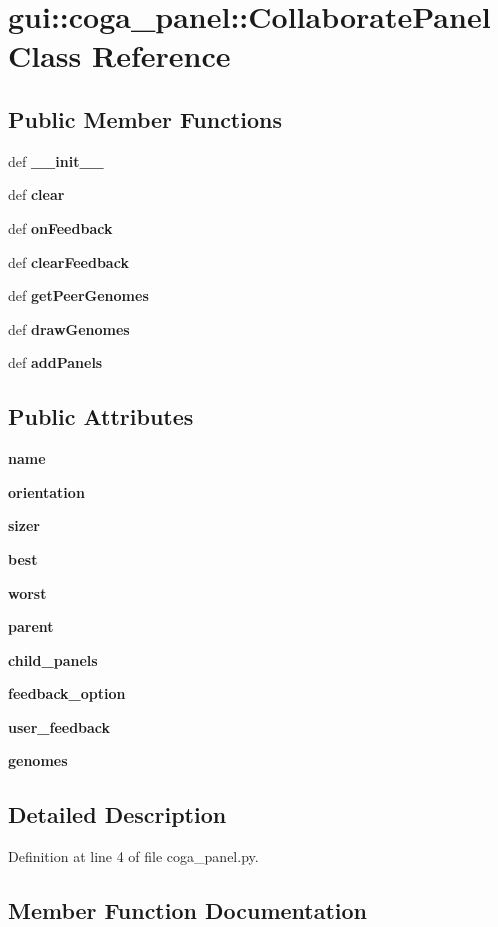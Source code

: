 \section{gui::coga\_\-panel::CollaboratePanel Class Reference}
\label{classgui_1_1coga__panel_1_1CollaboratePanel}
\subsection*{Public Member Functions}
\begin{CompactItemize}
\item 
def {\bf \_\-\_\-init\_\-\_\-}
\item 
def {\bf clear}
\item 
def {\bf onFeedback}
\item 
def {\bf clearFeedback}
\item 
def {\bf getPeerGenomes}
\item 
def {\bf drawGenomes}
\item 
def {\bf addPanels}
\end{CompactItemize}
\subsection*{Public Attributes}
\begin{CompactItemize}
\item 
{\bf name}
\item 
{\bf orientation}
\item 
{\bf sizer}
\item 
{\bf best}
\item 
{\bf worst}
\item 
{\bf parent}
\item 
{\bf child\_\-panels}
\item 
{\bf feedback\_\-option}
\item 
{\bf user\_\-feedback}
\item 
{\bf genomes}
\end{CompactItemize}


\subsection{Detailed Description}


Definition at line 4 of file coga\_\-panel.py.

\subsection{Member Function Documentation}
